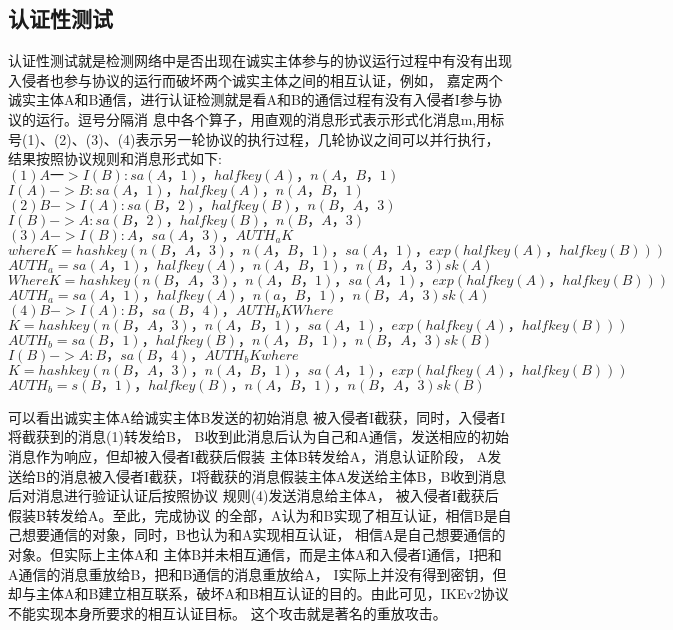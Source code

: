 \documentclass[UTF8]{ctexart}
\begin{document}
\subsection{认证性测试}
\par{认证性测试就是检测网络中是否出现在诚实主体参与的协议运行过程中有没有出现入侵者也参与协议的运行而破坏两个诚实主体之间的相互认证，例如，
嘉定两个诚实主体A和B通信，进行认证检测就是看A和B的通信过程有没有入侵者I参与协议的运行。逗号分隔消
息中各个算子，用直观的消息形式表示形式化消息m,用标号(1)、(2)、(3)、(4)表示另一轮协议的执行过程，几轮协议之间可以并行执行，
结果按照协议规则和消息形式如下:
}
$(1) A一>I(B):sa(A，1)，halfkey(A)，n(A，B，1)$ \\
$I(A)->B:sa(A，1)，halfkey(A)，n(A，B，1) $ \\
$(2) B -> I(A):sa(B，2)，halfkey(B)，n(B，A，3) $ \\
$I(B)->A:sa(B，2)，halfkey(B)，n(B，A，3) $ \\
$(3)A->I(B):{A，sa(A，3)，AUTH_{a}}K $ \\
$where K=hashkey(n(B，A，3)，n(A，B，1)，sa(A，1)，exp(halfkey(A)，halfkey(B))) $ \\
$AUTH_{a}={sa(A，1)，halfkey(A)，n(A，B，1)，n(B，A，3)}sk(A)$ \\
$Where K=hashkey(n(B，A，3)，n(A，B，1)，sa(A，1)，exp(halfkey(A)，halfkey(B))) $ \\
$AUTH_{a}={sa(A，1)，halfkey(A)，n(a，B，1)，n(B，A，3)}sk(A)$ \\
$(4)B->I(A):{B，sa(B，4)，AUTH_{b}}K Where$ \\
$K=hashkey(n(B，A，3)，n(A，B，1)，sa(A，1)，exp(halfkey(A)，halfkey(B))) $ \\
$AUTH_{b}={sa(B，1)，halfkey(B)，n(A，B，1)，n(B，A，3)}sk(B)$ \\
$I(B)->A:{B，sa(B，4)，AUTH_{b}}K where$ \\
$K=hashkey(n(B，A，3)，n(A，B，1)，sa(A，1)，exp(halfkey(A)，halfkey(B)))$ \\
$AUTH_{b}={s(B，1)，halfkey(B)，n(A，B，1)，n(B，A，3)}sk(B)$ \\
\par{
可以看出诚实主体A给诚实主体B发送的初始消息 被入侵者I截获，同时，入侵者I将截获到的消息(1)转发给B，
B收到此消息后认为自己和A通信，发送相应的初始消息作为响应，但却被入侵者I截获后假装 主体B转发给A，消息认证阶段，
A发送给B的消息被入侵者I截获，I将截获的消息假装主体A发送给主体B，B收到消息后对消息进行验证认证后按照协议 规则(4)发送消息给主体A，
被入侵者I截获后假装B转发给A。至此，完成协议 的全部，A认为和B实现了相互认证，相信B是自己想要通信的对象，同时，B也认为和A实现相互认证，
相信A是自己想要通信的对象。但实际上主体A和 主体B并未相互通信，而是主体A和入侵者I通信，I把和A通信的消息重放给B，把和B通信的消息重放给A，
I实际上并没有得到密钥，但却与主体A和B建立相互联系，破坏A和B相互认证的目的。由此可见，IKEv2协议不能实现本身所要求的相互认证目标。
这个攻击就是著名的重放攻击。
}
\end{document}
